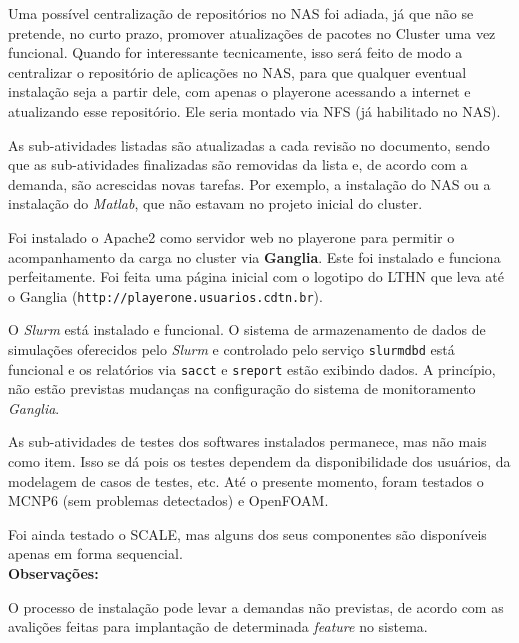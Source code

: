 Uma possível centralização de repositórios no NAS foi adiada, já que não se pretende, no curto prazo, promover atualizações de pacotes no Cluster uma vez 
funcional. Quando for interessante tecnicamente, isso será feito de modo a centralizar o repositório de aplicações no NAS, para que qualquer eventual instalação seja a partir dele, com apenas o playerone acessando a internet e atualizando esse repositório. Ele seria montado via NFS (já habilitado no NAS).

As sub-atividades listadas são atualizadas a cada revisão no documento, sendo que 
as sub-atividades finalizadas são removidas da lista e, de acordo com a demanda, 
são acrescidas novas tarefas. Por exemplo, a instalação do NAS ou a instalação do 
\textit{Matlab}, que não estavam no projeto inicial do cluster.

Foi instalado o Apache2 como servidor web no playerone para permitir o acompanhamento da carga no cluster via \textbf{Ganglia}. Este foi instalado 
e funciona perfeitamente. Foi feita uma página inicial com o logotipo do LTHN 
que leva até o Ganglia (\texttt{http://playerone.usuarios.cdtn.br}).

O \textit{Slurm} está instalado e funcional. O sistema de armazenamento de dados de simulações oferecidos pelo \textit{Slurm} e controlado pelo serviço \texttt{slurmdbd} está funcional e os relatórios via \texttt{sacct} e \texttt{sreport} estão exibindo dados. %
A princípio, não estão previstas mudanças na configuração do sistema de monitoramento \textit{Ganglia}.

As sub-atividades de testes dos softwares instalados permanece, mas não mais como item. Isso se dá pois os testes dependem da disponibilidade dos usuários, da modelagem de casos de testes, etc. Até o presente momento, foram testados o MCNP6 (sem problemas detectados) e OpenFOAM.

Foi ainda testado o SCALE, mas alguns dos seus componentes são disponíveis apenas 
em forma sequencial.\\



\textbf{Observações:}

O processo de instalação pode levar a demandas não previstas, de acordo com as avalições feitas para implantação de determinada \textit{feature} no sistema.

